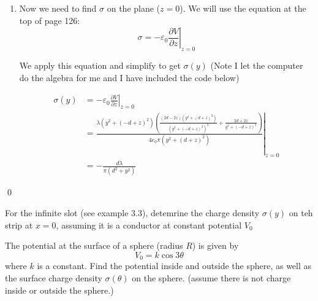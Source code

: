 \documentclass{homework}
\newcommand\ve{\varepsilon}
\newcommand{\fracpd}[2]{
    \ensuremath{\frac{\partial #1}{\partial #2}}
  }
\begin{document}
\begin{homeworkProblem}[Problem 3.10]
{\begin{enumerate}
        \begin{align*}
          V(y, z) = \frac{\lambda}{4 \pi \ve_0} ln \left( \frac{y^2 + (z + d)^2}{y^2 + (z -d)^2} \right)
        \end{align*}
      \item Now we need to find $\sigma$ on the plane ($z=0$). We will use the equation at the top of page 126: $$\sigma = - \ve_0 \left. \fracpd{V}{z} \right|_{z=0}$$

      We apply this equation and simplify to get $\sigma(y)$ (Note I let the computer do the algebra for me and I have included the code below)

      \begin{align*}
        \sigma(y) &= - \ve_0 \left. \fracpd{V}{z} \right|_{z=0} \\
          &= \left. \frac{\lambda \left(y^{2} + \left(- d + z\right)^{2}\right) \left(\frac{\left(2 d - 2 z\right) \left(y^{2} + \left(d + z\right)^{2}\right)}{\left(y^{2} + \left(- d + z\right)^{2}\right)^{2}} + \frac{2 d + 2 z}{y^{2} + \left(- d + z\right)^{2}}\right)}{4 e_{0} \pi \left(y^{2} + \left(d + z\right)^{2}\right)} \right|_{z=0} \\
          &=  - \frac{d \lambda}{\pi \left(d^{2} + y^{2}\right)}
      \end{align*}
    \end{enumerate}
      
    \qed
  }

\end{homeworkProblem}

\begin{homeworkProblem}[Problem 3.14]

  For the infinite slot (see example 3.3), detemrine the charge density $\sigma(y)$ on teh strip at $x=0$, assuming it is a conductor at constant potential $V_0$

  \vspace{.2in}

  \problemAnswer{ %

  }
\end{homeworkProblem}

\begin{homeworkProblem}[Problem 3.19]

  The potential at the surface of a sphere (radius $R$) is given by $$V_0 = k \cos 3 \theta$$ where $k$ is a constant. Find the potential inside and outside the sphere, as well as the surface charge density $\sigma(\theta)$ on the sphere. (assume there is not charge inside or outside the sphere.)

  \vspace{.2in}

  \problemAnswer{ %

  }
\end{homeworkProblem}
\end{document}
